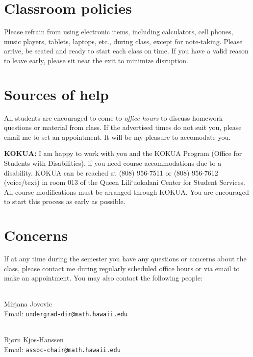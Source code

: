 \documentclass[12pt]{amsart}
\newcommand{\spacer}{\vspace{.2cm}}
\newcommand{\svs}{\vspace{.1cm}}
\begin{document}
\section*{Classroom policies}
Please refrain from using electronic items, including calculators, cell phones, music players, tablets, laptops, etc., during class, except for note-taking.
Please arrive, be seated and ready to start each class on time. If you have a valid reason to leave early, please sit near the exit to minimize disruption.

\section*{Sources of help}
All students are  encouraged to come to \textit{office hours} to discuss homework questions or material from class. If the advertised times do not suit you, please email me to set an appointment. It will be my pleasure to accomodate you.

{\bf KOKUA:} I am happy to work with you and the KOKUA Program (Office for Students with Disabilities), if you need course accommodations due to a disability. KOKUA can be reached at (808) 956-7511 or (808) 956-7612 (voice/text) in room 013 of the Queen Lili`uokalani Center for Student Services. All course modifications must be arranged through KOKUA. You are encouraged to start this process as early as possible.\svs

\section*{Concerns}
If at any time during the semester you have any questions or concerns about the class, please contact me during regularly scheduled office hours or via email to make an appointment. You may also contact the following people:
\spacer

\\
Mirjana Jovovic \\
Email: \texttt{undergrad-dir@math.hawaii.edu}

\svs
{}\\
Bj{\o}rn Kjos-Hanssen \\
Email: \texttt{assoc-chair@math.hawaii.edu}
\end{document}
